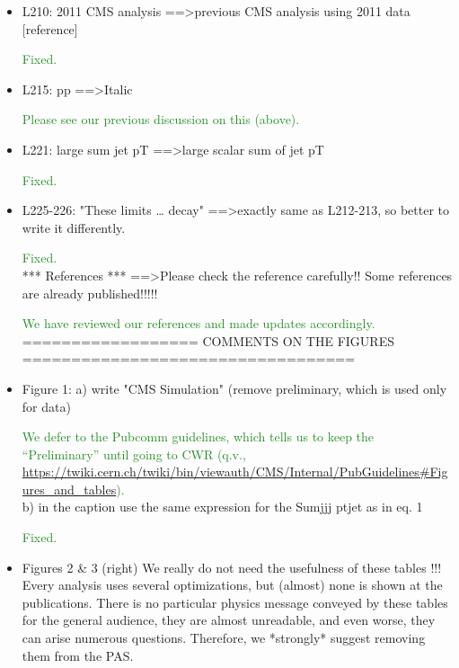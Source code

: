 \documentclass[paper=a4, fontsize=11pt]{scrartcl}
\begin{document}
\begin{itemize}
\item L210: 
2011 CMS analysis ==\textgreater previous CMS analysis using 2011 data [reference] 

\textcolor{ForestGreen}{Fixed.}\\


\item L215: 
pp ==\textgreater Italic 

\textcolor{ForestGreen}{Please see our previous discussion on this (above).}\\

\item L221: 
large sum jet pT ==\textgreater large scalar sum of jet pT 

\textcolor{ForestGreen}{Fixed.}\\

\item L225-226: 
"These limits … decay" ==\textgreater exactly same as L212-213, so better to write it 
differently. 

\textcolor{ForestGreen}{Fixed.}\\


*** References *** 
==\textgreater Please check the reference carefully!! Some references are already 
published!!!!! 

\textcolor{ForestGreen}{We have reviewed our references and made updates accordingly.}\\


================== COMMENTS ON THE FIGURES ================================== 


\item Figure 1: 
a) write "CMS Simulation" (remove preliminary, which is used only for data) 

\textcolor{ForestGreen}{We defer to the Pubcomm guidelines, which tells us to keep the
``Preliminary'' until going to CWR (q.v.,
	\url{https://twiki.cern.ch/twiki/bin/viewauth/CMS/Internal/PubGuidelines\#Figures_and_tables}).}\\

b) in the caption use the same expression for the Sumjjj ptjet as in eq. 1 

\textcolor{ForestGreen}{Fixed.}\\

\item Figures 2 \& 3 (right) 
We really do not need the usefulness of these tables !!! Every analysis uses 
several optimizations, but (almost) none is shown at the publications. There 
is no particular physics message conveyed by these tables for the general 
audience, they are almost unreadable, and even worse, they can arise numerous 
questions. Therefore, we *strongly* suggest removing them from the PAS. 


\end{itemize}
\end{document}
